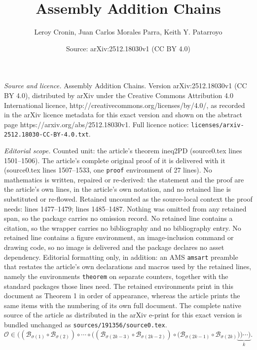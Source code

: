 \documentclass[10pt,a4paper]{amsart}
\title{Assembly Addition Chains}
\author{Leroy Cronin, Juan Carlos Morales Parra, Keith Y. Patarroyo}
\date{Source: arXiv:2512.18030v1 (CC BY 4.0)}
\begin{document}
\maketitle

\noindent\emph{Source and licence.} Assembly Addition Chains. Version arXiv:2512.18030v1 (CC BY 4.0), distributed by arXiv under the Creative Commons Attribution 4.0 International licence, http://creativecommons.org/licenses/by/4.0/, as recorded in the arXiv licence metadata for this exact version and shown on the abstract page https://arxiv.org/abs/2512.18030v1. Full licence notice: \texttt{licenses/arxiv-2512.18030-CC-BY-4.0.txt}.\par\smallskip

\noindent\textit{Editorial scope.} Counted unit: the article's theorem ineq2PD (source0.tex lines 1501--1506). The article's complete original proof of it is delivered with it (source0.tex lines 1507--1533, one \texttt{proof} environment of 27 lines). No mathematics is written, repaired or re-derived: the statement and the proof are the article's own lines, in the article's own notation, and no retained line is substituted or re-flowed.  Retained uncounted as the source-local context the proof needs: lines 1477--1479; lines 1485--1487.  Nothing was omitted from any retained span, so the package carries no omission record.  No retained line contains a citation, so the wrapper carries no bibliography and no bibliography entry.  No retained line contains a figure environment, an image-inclusion command or drawing code, so no image is delivered and the package declares no asset dependency.  Editorial formatting only, in addition: an AMS \texttt{amsart} preamble that restates the article's own declarations and macros used by the retained lines, namely the environments \texttt{theorem} on separate counters, together with the standard packages those lines need.  The retained environments print in this document as Theorem 1 in order of appearance, whereas the article prints the same items with the numbering of its own full document.  The complete native source of the article as distributed in the arXiv e-print for this exact version is bundled unchanged as \texttt{sources/191356/source0.tex}.
        \begin{equation}\label{2piece2k}
        \mathscr{O} \in ((\mathscr{B}_{\sigma(1)} \circ \mathscr{B}_{\sigma(2)}) \circ \cdots \circ ((\mathscr{B}_{\sigma(2k-3)} \circ \mathscr{B}_{\sigma(2k-2)}) \circ (\mathscr{B}_{\sigma(2k-1)} \circ \mathscr{B}_{\sigma(2k)}\underbrace{)) \cdots )}_{k}.
        \end{equation}
\end{document}
